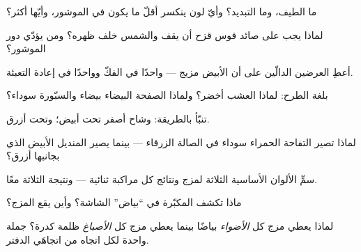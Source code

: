\begin{exercise}[$\star$]\label{exo:g8:colors-spectra:1}
ما الطيف، وما التبديد؟ وأيّ لون ينكسر أقلّ ما يكون في
الموشور، وأيّها أكثر؟
\end{exercise}

\begin{exercise}[$\star$]\label{exo:g8:colors-spectra:2}
لماذا يجب على صائد قوس قزح أن يقف والشمس خلف ظهره؟ ومن يؤدّي
دور الموشور؟
\end{exercise}

\begin{exercise}[$\star$]\label{exo:g8:colors-spectra:3}
أعطِ العرضين الدالّين على أن  الأبيض مزيج --- واحدًا في
الفكّ وواحدًا في إعادة التعبئة.
\end{exercise}

\begin{exercise}[$\star$]\label{exo:g8:colors-spectra:4}
بلغة الطرح: لماذا العشب أخضر؟ ولماذا الصفحة البيضاء بيضاء
والسبّورة سوداء؟
\end{exercise}

\begin{exercise}[$\star$]\label{exo:g8:colors-spectra:5}
تنبّأ بالطريقة: وشاح أصفر تحت  أبيض؛ وتحت  أزرق.
\end{exercise}

\begin{exercise}[$\star$]\label{exo:g8:colors-spectra:6}
لماذا تصير التفاحة الحمراء سوداء في الصالة الزرقاء --- بينما
يصير المنديل الأبيض الذي بجانبها أزرق؟
\end{exercise}

\begin{exercise}[$\star$]\label{exo:g8:colors-spectra:7}
سمِّ الألوان الأساسية الثلاثة لمزج  ونتائج كل مراكبة
ثنائية --- ونتيجة الثلاثة معًا.
\end{exercise}

\begin{exercise}[$\star$]\label{exo:g8:colors-spectra:8}
ماذا تكشف المكبّرة في ``بياض'' الشاشة؟ وأين يقع المزج؟
\end{exercise}

\begin{exercise}[$\star\star$]\label{exo:g8:colors-spectra:9}
لماذا يعطي مزج كل \emph{الأضواء} بياضًا بينما يعطي مزج كل
\emph{الأصباغ} ظلمة كدرة؟ جملة واحدة لكل اتجاه من اتجاهَي
الدفتر.
\end{exercise}

